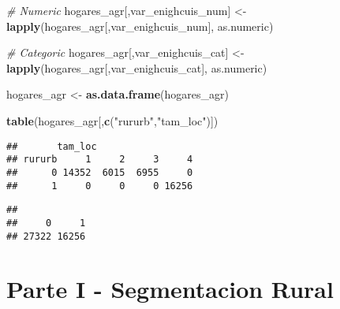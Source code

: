 \documentclass[11pt,]{article}
\newenvironment{Shaded}{\begin{snugshade}}{\end{snugshade}}
\newcommand{\KeywordTok}[1]{\textcolor[rgb]{0.13,0.29,0.53}{\textbf{#1}}}
\newcommand{\StringTok}[1]{\textcolor[rgb]{0.31,0.60,0.02}{#1}}
\newcommand{\CommentTok}[1]{\textcolor[rgb]{0.56,0.35,0.01}{\textit{#1}}}
\newcommand{\OperatorTok}[1]{\textcolor[rgb]{0.81,0.36,0.00}{\textbf{#1}}}
\newcommand{\NormalTok}[1]{#1}
\begin{document}
\begin{Shaded}
\begin{Highlighting}[]
\CommentTok{# Numeric}
\NormalTok{hogares_agr[,var_enighcuis_num] <-}\StringTok{ }\KeywordTok{lapply}\NormalTok{(hogares_agr[,var_enighcuis_num],}
\NormalTok{                                          as.numeric)}

\CommentTok{# Categoric}
\NormalTok{hogares_agr[,var_enighcuis_cat] <-}\StringTok{ }\KeywordTok{lapply}\NormalTok{(hogares_agr[,var_enighcuis_cat],}
\NormalTok{                                          as.numeric)}

\NormalTok{hogares_agr <-}\StringTok{ }\KeywordTok{as.data.frame}\NormalTok{(hogares_agr)}

\KeywordTok{table}\NormalTok{(hogares_agr[,}\KeywordTok{c}\NormalTok{(}\StringTok{"rururb"}\NormalTok{,}\StringTok{"tam_loc"}\NormalTok{)])}
\end{Highlighting}
\end{Shaded}

\begin{verbatim}
##       tam_loc
## rururb     1     2     3     4
##      0 14352  6015  6955     0
##      1     0     0     0 16256
\end{verbatim}

\begin{Shaded}
\end{Shaded}

\begin{verbatim}
## 
##     0     1 
## 27322 16256
\end{verbatim}

\section{Parte I - Segmentacion
Rural}\label{parte-i---segmentacion-rural}
\end{document}
